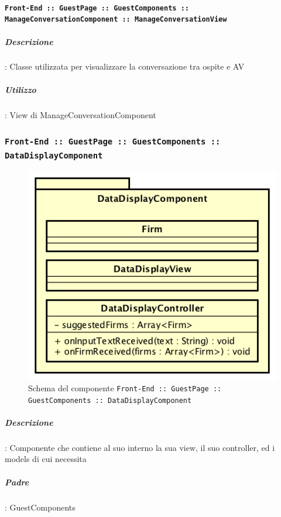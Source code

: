 \documentclass[../DefinizioneDiProdotto_v3.0.0.tex]{subfiles}
\begin{document}
			\paragraph{\texttt{Front-End :: GuestPage :: GuestComponents :: ManageConversationComponent :: ManageConversationView}}

				\subparagraph{Descrizione}: Classe utilizzata per visualizzare la conversazione tra ospite e AV
				\subparagraph{Utilizzo}: View di ManageConversationComponent



	\newpage
	\subsubsection{\texttt{Front-End :: GuestPage :: GuestComponents :: DataDisplayComponent}}
	\begin{figure}[!h]
		\centering
		\includegraphics[scale=0.7]{Architettura/Front-End/GuestPage/GuestComponents/DataDisplayComponent.png}
		\caption{Schema del componente \texttt{Front-End :: GuestPage :: GuestComponents :: DataDisplayComponent}}
	\end{figure}

			\subparagraph{Descrizione}: Componente che contiene al suo interno la sua view, il suo controller, ed i models di cui necessita
			\subparagraph{Padre}: GuestComponents
\end{document}
